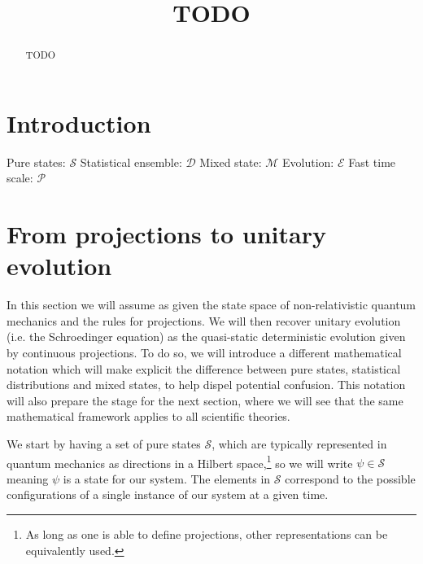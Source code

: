 \documentclass[11pt]{article}
\begin{document}
\title{TODO}

\maketitle

\begin{abstract}
	TODO
\end{abstract}

\tableofcontents
\newpage

\section{Introduction}

Pure states: $\mathcal{S} $
Statistical ensemble: $\mathcal{D} $
Mixed state: $\mathcal{M} $
Evolution: $\mathcal{E}$
Fast time scale: $\mathcal{P}$

\section{From projections to unitary evolution}

In this section we will assume as given the state space of non-relativistic quantum mechanics and the rules for projections. We will then recover unitary evolution (i.e. the Schroedinger equation) as the quasi-static deterministic evolution given by continuous projections. To do so, we will introduce a different mathematical notation which will make explicit the difference between pure states, statistical distributions and mixed states, to help dispel potential confusion. This notation will also prepare the stage for the next section, where we will see that the same mathematical framework applies to all scientific theories.

We start by having a set of pure states $\mathcal{S}$, which are typically represented in quantum mechanics as directions in a Hilbert space,\footnote{As long as one is able to define projections, other representations can be equivalently used.} so we will write $\psi \in \mathcal{S}$ meaning $\psi$ is a state for our system. The elements in $\mathcal{S}$ correspond to the possible configurations of a single instance of our system at a given time.
\end{document}
